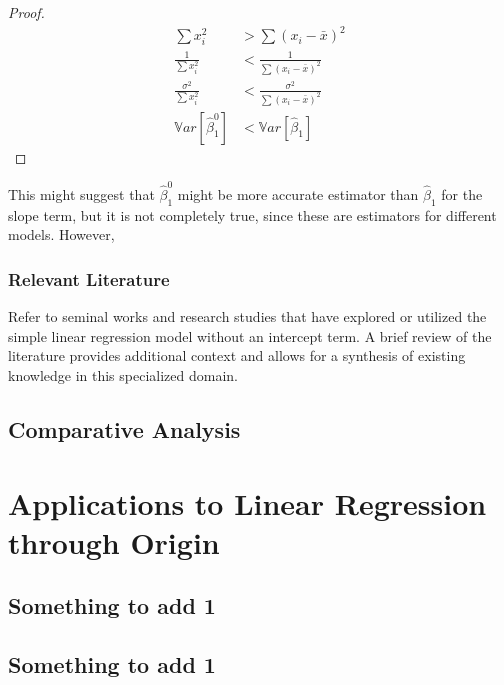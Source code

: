 \documentclass[12pt,a4paper,oneside]{book} %
\begin{document}
	\begin{proof}
		\begin{align*}
			\sum x_i^2 &> \sum (x_i - \bar{x})^2  \\
			\frac{1}{\sum x_i^2}  &< \frac{1}{\sum (x_i - \bar{x})^2}  \\
			\frac{\sigma^2}{\sum x_i^2}  &< \frac{\sigma^2}{\sum (x_i - \bar{x})^2}  \\
			\mathbb{V}ar[\hat{\beta}_1^0] &< \mathbb{V}ar[\hat{\beta}_1] 
		\end{align*}
	\end{proof}


This might suggest that $\hat{\beta}_1^0$ might be more accurate estimator than $\hat{\beta}_1$ for the slope term, but it is not completely true, since these are estimators for different models. However, 	

	


	\subsection{Relevant Literature}
	Refer to seminal works and research studies that have explored or utilized the simple linear regression model without an intercept term. A brief review of the literature provides additional context and allows for a synthesis of existing knowledge in this specialized domain.



	
	
	\clearpage

	\section{Comparative Analysis}	
	


	
	\clearpage

	
	\chapter{Applications to Linear Regression through Origin}


	\clearpage

	\section{Something to add 1} 

	
	\section{Something to add 1} 
\end{document}
